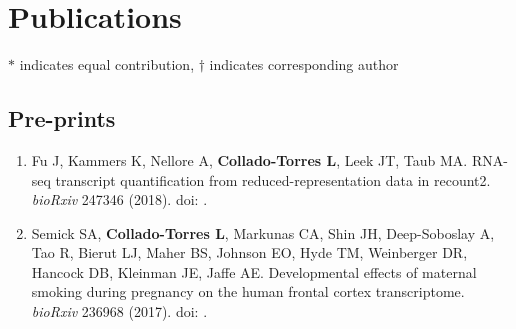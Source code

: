 \section{Publications}

$*$ indicates equal contribution, $\dagger$ indicates corresponding author

\subsection{Pre-prints}
    \begin{enumerate}
        \item Fu J, Kammers K, Nellore A, \textbf{Collado-Torres L}, Leek JT, Taub MA. RNA-seq transcript quantification from reduced-representation data in recount2. \emph{bioRxiv} 247346 (2018). doi: .        
        \item Semick SA, \textbf{Collado-Torres L}, Markunas CA, Shin JH, Deep-Soboslay A, Tao R, Bierut LJ, Maher BS, Johnson EO, Hyde TM, Weinberger DR, Hancock DB, Kleinman JE, Jaffe AE. Developmental effects of maternal smoking during pregnancy on the human frontal cortex transcriptome. \emph{bioRxiv} 236968 (2017). doi: .
    \end{enumerate}

